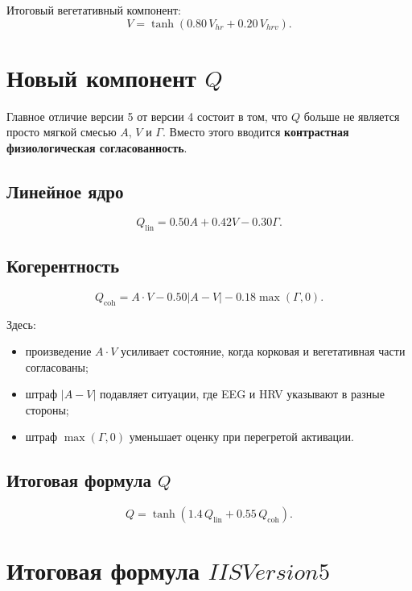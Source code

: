 \documentclass[12pt,a4paper]{article}
\begin{document}
Итоговый вегетативный компонент:
\begin{equation}
V=\tanh\!\left(0.80\,V_{hr}+0.20\,V_{hrv}\right).
\end{equation}

\section{Новый компонент \(Q\)}
Главное отличие версии 5 от версии 4 состоит в том, что $Q$ больше не является просто мягкой смесью $A$, $V$ и $\Gamma$. Вместо этого вводится \textbf{контрастная физиологическая согласованность}.

\subsection{Линейное ядро}
\begin{equation}
Q_{\mathrm{lin}}=0.50A+0.42V-0.30\Gamma.
\end{equation}

\subsection{Когерентность}
\begin{equation}
Q_{\mathrm{coh}}=A\cdot V-0.50|A-V|-0.18\max(\Gamma,0).
\end{equation}

Здесь:
\begin{itemize}[leftmargin=1.25cm]
    \item произведение $A\cdot V$ усиливает состояние, когда корковая и вегетативная части согласованы;
    \item штраф $|A-V|$ подавляет ситуации, где EEG и HRV указывают в разные стороны;
    \item штраф $\max(\Gamma,0)$ уменьшает оценку при перегретой активации.
\end{itemize}

\subsection{Итоговая формула \(Q\)}
\begin{equation}
Q=\tanh\!\left(1.4\,Q_{\mathrm{lin}}+0.55\,Q_{\mathrm{coh}}\right).
\end{equation}

\section{Итоговая формула \(IISVersion5\)}
\end{document}
